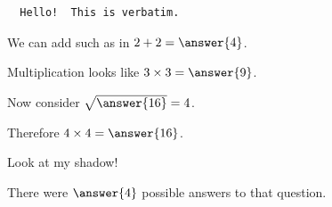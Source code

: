 \documentclass{ximera}
\begin{document}
\begin{verbatim}
  Hello!  This is verbatim.
\end{verbatim}

\begin{problem}
  We can add such as in $2 + 2 = \answer{4}$.
  
  \begin{problem}
    Multiplication looks like $3 \times 3 = \answer{9}$.
    
    \begin{problem}
      Now consider $\sqrt{\answer{16}} = 4$.
      
      \begin{problem}
        Therefore $4 \times 4 = \answer{16}$.
      \end{problem}
    \end{problem}
  \end{problem}
\end{problem}

\begin{theorem}
Look at my shadow!
\end{theorem}

\begin{problem}
  \begin{multipleChoice}
  \end{multipleChoice}

  \begin{problem}
    There were $\answer{4}$ possible answers to that question.

    \begin{problem}
      \begin{multipleChoice}
      \end{multipleChoice}
    \end{problem}
  \end{problem}
\end{problem}
\end{document}
